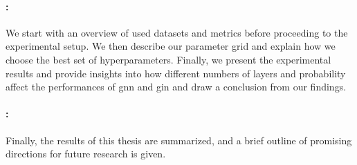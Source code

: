 \paragraph{: }
We start with an overview of used datasets and metrics before proceeding to the experimental setup.
We then describe our parameter grid and explain how we choose the best set of hyperparameters.
Finally, we present the experimental results and provide insights into how different numbers of layers and probability affect the performances of \ac{gnn} and \ac{gin} and draw a conclusion from our findings.
\paragraph{: }
Finally, the results of this thesis are summarized, and a brief outline of promising directions for future research is given.
